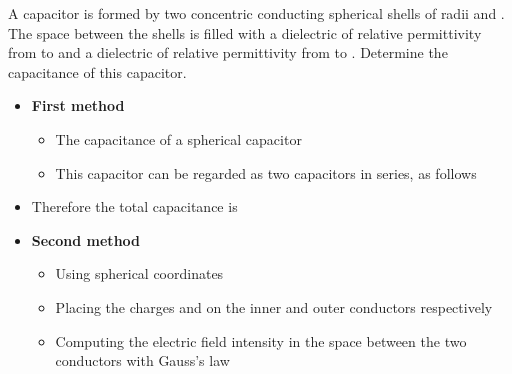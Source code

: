 \begin{ELexample}{}

A capacitor is formed by two concentric conducting spherical shells of radii  and . The space between the shells is filled with a dielectric of relative permittivity  from  to  and a dielectric of relative permittivity  from  to . Determine the capacitance of this capacitor.


\begin{ELsolution}

\begin{itemize}
\tightlist
\item
  \textbf{First method}

  \begin{itemize}
  \tightlist
  \item
    The capacitance of a spherical capacitor \ELim{\ELto} 
  \item
    This capacitor can be regarded as two capacitors in series, as follows
  \end{itemize}
\end{itemize}


\begin{itemize}
\tightlist
\item
  Therefore the total capacitance is
\end{itemize}


\begin{itemize}
\tightlist
\item
  \textbf{Second method}

  \begin{itemize}
  \tightlist
  \item
    Using spherical coordinates
  \item
    Placing the charges  and  on the inner and outer conductors respectively
  \item
    Computing the electric field intensity in the space between the two conductors with Gauss's law
  \end{itemize}
\end{itemize}


\end{ELsolution}
\end{ELexample}
